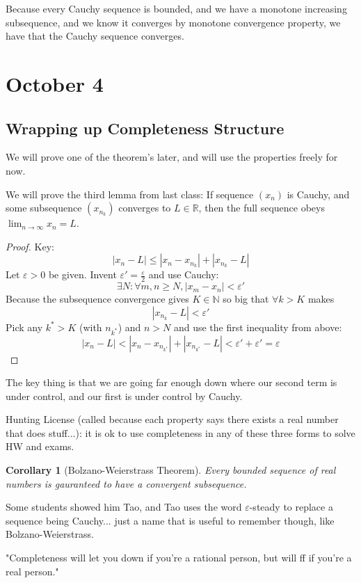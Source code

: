 \documentclass{article}
\theoremstyle{plain}
\newtheorem{corollary}{Corollary}
\theoremstyle{remark}
\newcommand{\N}{{\mathbb N}}
\newcommand{\R}{{\mathbb R}}
\newcommand{\ep}{{\varepsilon}}
\begin{document}
Because every Cauchy sequence is bounded,
and we have a monotone increasing subsequence,
and we know it converges by monotone convergence property,
we have that the Cauchy sequence converges.

\section{October 4}
\subsection{Wrapping up Completeness Structure}
We will prove one of the theorem's later,
and will use the properties freely for now.

We will prove the third lemma from last class:
	If sequence $(x_n)$ is Cauchy, and some subsequence $(x_{n_k})$
	converges to $L \in \R$,
	then the full sequence obeys $\lim_{n\to\infty}x_n = L$.
\begin{proof}
	Key:
	\[
		|x_n - L| \leq |x_n - x_{n_k}| + |x_{n_k} - L|
	\]
	Let $\ep>0$ be given. Invent $\ep' = \frac{\ep}{2}$ and use Cauchy:
	\[
		\exists N\colon \forall m,n \geq N, |x_m - x_n| < \ep'
	\]
	Because the subsequence convergence gives $K \in \N$ so big that
	$\forall k > K$ makes
	\[
		|x_{n_k} - L| < \ep'
	\]
	Pick any $k^* > K$ (with $n_{k^*}$) and $n>N$ and use the first inequality from above:
	\[
		|x_n - L| < |x_n - x_{n_{k^*}}| + |x_{n_{k^*}} - L| < \ep' + \ep' = \ep
	\]
\end{proof}
The key thing is that we are going far enough down where our second term is under control,
and our first is under control by Cauchy.

Hunting License (called because each property
says there exists a real number that does stuff...):
it is ok to use completeness in any of these three forms to solve HW and exams.

\begin{corollary}[Bolzano-Weierstrass Theorem]
	Every bounded sequence of real numbers is
	gauranteed to have a convergent subsequence.
\end{corollary}

Some students showed him Tao,
and Tao uses the word $\ep$-steady to replace a sequence being Cauchy...
just a name that is useful to remember though, like Bolzano-Weierstrass.

"Completeness will let you down if you're a rational person,
but will ff if you're a real person."
\end{document}
